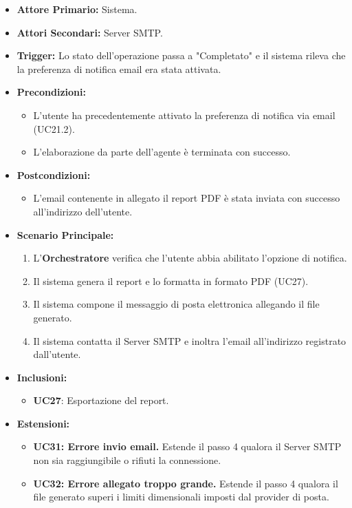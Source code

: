 \documentclass[12pt, a4paper]{article}
\begin{document}
\begin{itemize}
    \item \textbf{Attore Primario:} Sistema.
    \item \textbf{Attori Secondari:} Server SMTP.
    \item \textbf{Trigger:} Lo stato dell'operazione passa a "Completato" e il sistema rileva che la preferenza di notifica email era stata attivata.
    \item \textbf{Precondizioni:}
    \begin{itemize}
        \item L'utente ha precedentemente attivato la preferenza di notifica via email (UC21.2).
        \item L'elaborazione da parte dell'agente è terminata con successo.
    \end{itemize}
    \item \textbf{Postcondizioni:}
    \begin{itemize}
        \item L'email contenente in allegato il report PDF è stata inviata con successo all'indirizzo dell'utente.
    \end{itemize}
    \item \textbf{Scenario Principale:}
    \begin{enumerate}
        \item L'\textbf{Orchestratore} verifica che l'utente abbia abilitato l'opzione di notifica.
        \item Il sistema genera il report e lo formatta in formato PDF (UC27).
        \item Il sistema compone il messaggio di posta elettronica allegando il file generato.
        \item Il sistema contatta il Server SMTP e inoltra l'email all'indirizzo registrato dall'utente.
    \end{enumerate}
    \item \textbf{Inclusioni:}
    \begin{itemize}
        \item \textbf{UC27}: Esportazione del report.
    \end{itemize}
    \item \textbf{Estensioni:}
    \begin{itemize}
        \item \textbf{UC31: Errore invio email.} Estende il passo 4 qualora il Server SMTP non sia raggiungibile o rifiuti la connessione.
        \item \textbf{UC32: Errore allegato troppo grande.} Estende il passo 4 qualora il file generato superi i limiti dimensionali imposti dal provider di posta.
    \end{itemize}
\end{itemize}
\end{document}
